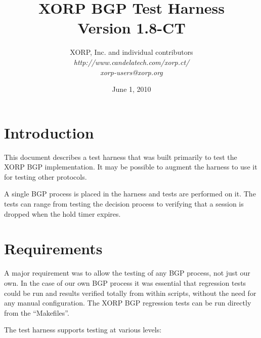 \documentclass[11pt]{article}
\begin{document}
\title{XORP BGP Test Harness \\
\vspace{1ex}
Version 1.8-CT}
\author{ XORP, Inc. and individual contributors		\\
         {\it http://www.candelatech.com/xorp.ct/}			\\
	 {\it xorp-users@xorp.org}
}
\date{June 1, 2010}

\maketitle


%
%
\newcommand{\coordinator}{{\em coordinator}\xspace}
\newcommand{\testpeer}{{\em test peer}\xspace}
\newcommand{\testpeers}{{\em test peers}\xspace}

\section{Introduction}

This document describes a test harness that was built primarily to
test the XORP BGP implementation. It may be possible to augment the
harness to use it for testing other protocols.

A single BGP process is placed in the harness and tests
are performed on it. The tests can range from testing the decision
process to verifying that a session is dropped when the hold timer expires.

\section{Requirements}

A major requirement was to allow the testing of any BGP process, not
just our own. In the case of our own BGP process it was essential that
regression tests could be run and results verified totally from within
scripts, without the need for any manual configuration. The
XORP BGP regression tests can be run directly from the ``Makefiles''.
\newline

The test harness supports testing at various levels:
\end{document}
